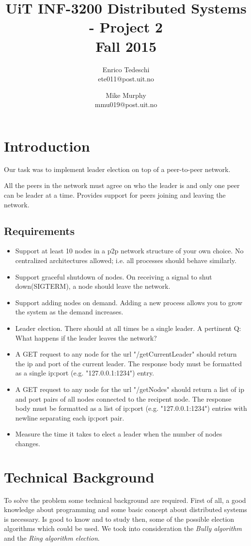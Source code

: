 \documentclass[11pt,conference]{IEEEtran}
\title{UiT INF-3200 Distributed Systems - Project 2\\Fall 2015}
\author{Enrico Tedeschi\\ete011@post.uit.no
    \and Mike Murphy\\mmu019@post.uit.no}
\begin{document}
\maketitle


\section{Introduction}

Our task was to implement leader election on top of a peer-to-peer network.

All the peers in the network must agree on who the leader is and only one peer can be leader at a time. Provides support for peers joining and leaving the network.


\subsection{Requirements}

\begin{itemize}
\item Support at least 10 nodes in a p2p network structure of your own choice. No centralized architectures allowed; i.e. all processes should behave similarly.
\item Support graceful shutdown of nodes. On receiving a signal to shut down(SIGTERM), a node should leave the network.
\item Support adding nodes on demand. Adding a new process allows you to grow the system as the demand increases.
\item Leader election. There should at all times be a single leader. A pertinent Q: What happens if the leader leaves the network?
\item A GET request to any node for the url "/getCurrentLeader" should return the ip and port of the current leader. The response body must be formatted as a single ip:port (e.g. "127.0.0.1:1234") entry.
\item A GET request to any node for the url "/getNodes" should return a list of ip and port pairs of all nodes connected to the recipent node. The response body must be formatted as a list of ip:port (e.g. "127.0.0.1:1234") entries with newline separating each ip:port pair.
\item Measure the time it takes to elect a leader when the number of nodes changes.
\end{itemize}


\section{Technical Background}
To solve the problem some technical background are required. First of all, a good knowledge about programming and some basic concept about distributed systems is necessary. Is good to know and to study then, some of the possible election algorithms which could be used. We took into consideration the \textit{Bully algorithm} and the \textit{Ring algorithm election}.
\end{document}
